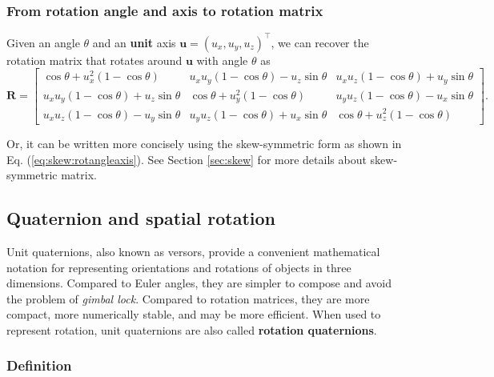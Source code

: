 \documentclass[12pt]{article}
\numberwithin{equation}{section}
\begin{document}
\subsubsection{From rotation angle and axis to rotation matrix}

Given an angle $\theta$ and an \textbf{unit} axis $\mathbf{u} = (u_x, u_y, u_z)^\top$, we can recover the rotation matrix that rotates around $\mathbf{u}$ with angle $\theta$ as
\begin{equation}
\mathbf{R} =
\begin{bmatrix}
\cos\theta + u_x^2 (1 - \cos\theta) & u_xu_y(1-\cos\theta) - u_z\sin\theta & u_xu_z(1 - \cos\theta) + u_y\sin\theta \\
u_xu_y(1-\cos\theta) + u_z\sin\theta & \cos\theta + u_y^2 (1 - \cos\theta) & u_yu_z(1 - \cos\theta) - u_x\sin\theta \\
u_xu_z(1 - \cos\theta) - u_y\sin\theta & u_yu_z(1 - \cos\theta) + u_x\sin\theta & \cos\theta + u_z^2 (1 - \cos\theta)
\end{bmatrix}.
\label{eq:rot:full}
\end{equation}

Or, it can be written more concisely using the skew-symmetric form as shown in Eq. (\ref{eq:skew:rotangleaxis}). See Section \ref{sec:skew} for more details about skew-symmetric matrix.

\subsection{Quaternion and spatial rotation}

Unit quaternions, also known as versors, provide a convenient mathematical notation for representing orientations and rotations of objects in three dimensions. Compared to Euler angles, they are simpler to compose and avoid the problem of \textit{gimbal lock}. Compared to rotation matrices, they are more compact, more numerically stable, and may be more efficient. When used to represent rotation, unit quaternions are also called \textbf{rotation quaternions}.

\subsubsection{Definition}
\end{document}
